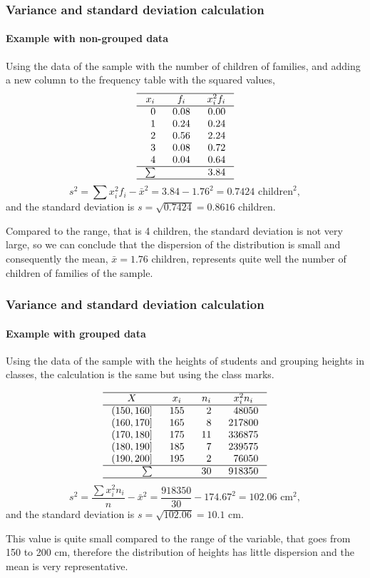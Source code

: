 \begin{frame}
\frametitle{Variance and standard deviation calculation}
\framesubtitle{Example with non-grouped data}
Using the data of the sample with the number of children of families, and adding a new column to the frequency table
with the squared values, 
\[
\setlength\arraycolsep{3mm}
\setlength\arrayrulewidth{0.5pt}
\begin{array}{rrr}
\hline
\multicolumn{1}{c}{x_i} & \multicolumn{1}{c}{f_i} & \multicolumn{1}{c}{x_i^2f_i} \\
\hline
0 & 0.08 & 0.00 \\
1 & 0.24 & 0.24 \\
2 & 0.56 & 2.24\\
3 & 0.08  & 0.72\\
4 & 0.04 & 0.64 \\
\hline
\sum &  &  3.84\\ 
\hline
\end{array}
\]
\[
s^2 = \sum x_i^2f_i-\bar x^2 = 3.84-1.76^2= 0.7424 \mbox{ children}^2,
\]
and the standard deviation is $s=\sqrt{0.7424} = 0.8616$ children.

Compared to the range, that is 4 children, the standard deviation is not very large, so we can conclude
that the dispersion of the distribution is small and consequently the mean, $\bar x=1.76$ children, represents quite
well the number of children of families of the sample. 
\end{frame}


\begin{frame}
\frametitle{Variance and standard deviation calculation}
\framesubtitle{Example with grouped data}
Using the data of the sample with the heights of students and grouping heights in classes, the calculation is the same
but using the class marks. 

\[
\setlength\arraycolsep{3mm}
\setlength\arrayrulewidth{0.5pt}
\begin{array}{rrrr}
\hline
\multicolumn{1}{c}{X} & \multicolumn{1}{c}{x_i} & \multicolumn{1}{c}{n_i} & \multicolumn{1}{c}{x_i^2n_i} \\
\hline
(150,160] & 155 & 2 & 48050\\
(160,170] & 165 & 8 & 217800\\
(170,180] & 175 & 11 & 336875\\
(180,190] & 185 & 7 & 239575\\
(190,200] & 195 & 2 & 76050\\
\hline
\sum &  & 30 & 918350 \\
\hline
\end{array}
\]
\[
s^2 = \frac{\sum x_i^2n_i}{n}-\bar x^2 = \frac{918350}{30}-174.67^2= 102.06 \mbox{ cm}^2,
\]
and the standard deviation is $s=\sqrt{102.06} = 10.1$ cm.

This value is quite small compared to the range of the variable, that goes from 150 to 200 cm, therefore the
distribution of heights has little dispersion and the mean is very representative.
\end{frame}


